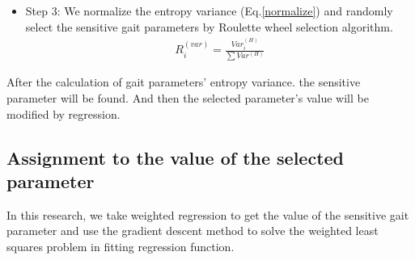 \begin{itemize}
	\item Step 3: We normalize the entropy variance (Eq.\ref{normalize}) and randomly select the sensitive gait parameters by Roulette wheel selection algorithm. %
	\begin{eqnarray}\label{normalize}
	R_{i}^{(var)}=\frac{Var_{i}^{(H)}}{\sum Var^{(H)}}
	\end{eqnarray}
	
\end{itemize}

After the calculation of gait parameters' entropy variance. the sensitive parameter will be found. And then the selected parameter's value will be modified by regression.


\subsection{Assignment to the value of the selected parameter}

In this research, we take weighted regression to get the value of the sensitive gait parameter and use the gradient descent method to solve the weighted least squares problem in fitting regression function.

